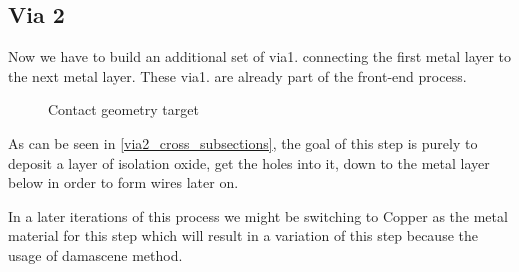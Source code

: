 \subsection{Via 2}\label{chapter_via2}

Now we have to build an additional set of via1. connecting the first metal layer to the next metal layer.
These via1. are already part of the front-end process.

\begin{figure}[H]
	\centering
	\begin{tikzpicture}[node distance = 3cm, auto, thick,scale=\CrossSectionOnly, every node/.style={transform shape}]
		
	\end{tikzpicture}
	\caption{Contact geometry target}
	\label{via2_cross_subsections}
\end{figure}

As can be seen in \autoref{via2_cross_subsections}, the goal of this step is purely to deposit a layer of isolation oxide, get the holes into it, down to the metal layer below in order to form wires later on.

In a later iterations of this process we might be switching to Copper as the metal material for this step which will result in a variation of this step because the usage of damascene method.
